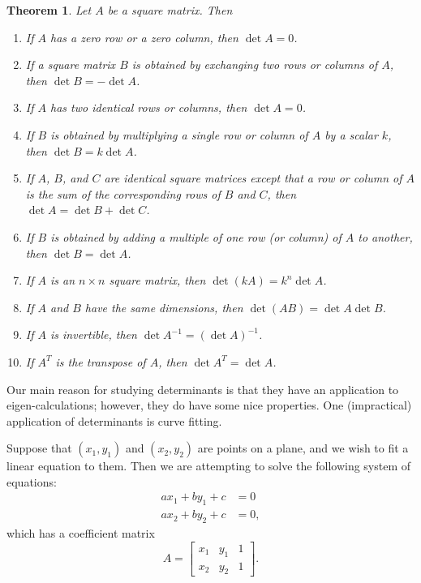 \documentclass[10pt, a4paper]{amsart}
\newtheorem{thm}{Theorem}
\theoremstyle{definition}
\theoremstyle{remark}
\begin{document}
\begin{thm}
  Let $ A $ be a square matrix. Then
  \begin{enumerate}
    \item If $ A $ has a zero row or a zero column, then $ \det A = 0 $.
    \item If a square matrix $ B $ is obtained by exchanging two rows or columns of $ A $, then $ \det B = -\det A $.
    \item If $ A $ has two identical rows or columns, then $ \det A = 0 $.
    \item If $ B $ is obtained by multiplying a single row or column of $ A $ by a scalar $ k $, then $ \det B = k\det A $.
    \item If $ A $, $ B $, and $ C $ are identical square matrices except that a row or column of $ A $ is the sum
          of the corresponding rows of $ B $ and $ C $, then $ \det A = \det B + \det C $.
    \item If $ B $ is obtained by adding a multiple of one row (or column) of $ A $ to another, then $ \det B = \det A $.
    \item If $ A $ is an $ n \times n $ square matrix, then $ \det (kA) = k^n \det A $.
    \item If $ A $ and $ B $ have the same dimensions, then $ \det (AB) = \det A \det B $.
    \item If $ A $ is invertible, then $ \det A^{-1} = (\det A)^{-1}$.
    \item If $ A^T $ is the transpose of $ A $, then $ \det A^T = \det A $.
  \end{enumerate}
\end{thm}

Our main reason for studying determinants is that they have an application to eigen-calculations; however, they
do have some nice properties. One (impractical) application of determinants is curve fitting.

Suppose that $ (x_1, y_1) $ and $ (x_2, y_2) $ are points on a plane, and we wish to fit a linear
equation to them. Then we are attempting to solve the following system of equations:
\begin{align*}
  a x_1 + b y_1 + c &= 0\\
  a x_2 + b y_2 + c &= 0,
\end{align*}
which has a coefficient matrix
\begin{displaymath}
  A = \begin{bmatrix} x_1 & y_1 & 1 \\ x_2 & y_2 & 1 \end{bmatrix}.
\end{displaymath}
\end{document}
